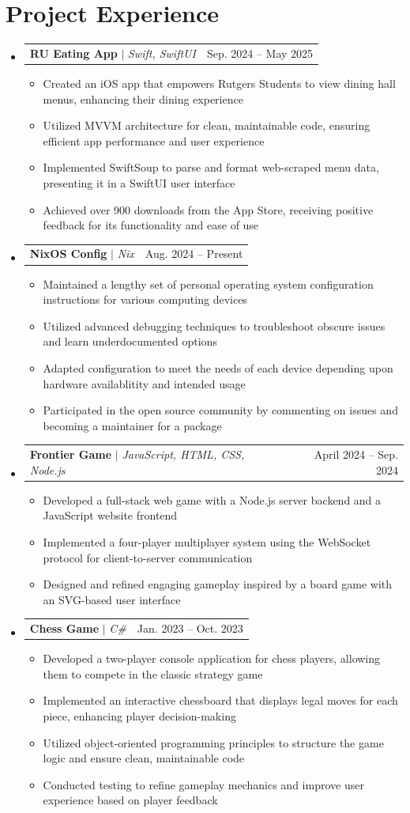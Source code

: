 \documentclass[letterpaper,11pt]{article}
\makeatletter
\newcommand{\resumeItem}[1]{
  \item\small{
    {#1 \vspace{-2pt}}
  }
}
\newcommand{\resumeProjectHeading}[2]{
    \item
    \begin{tabular*}{0.97\textwidth}{l@{\extracolsep{\fill}}r}
      \small#1 & #2 \\
    \end{tabular*}\vspace{-7pt}
}
\newcommand{\resumeSubHeadingListStart}{\begin{itemize}[leftmargin=0.15in, label={}]}
\newcommand{\resumeSubHeadingListEnd}{\end{itemize}}
\newcommand{\resumeItemListStart}{\begin{itemize}}
\newcommand{\resumeItemListEnd}{\end{itemize}\vspace{-5pt}}
\makeatother
\begin{document}
\section{Project Experience}
    \resumeSubHeadingListStart
      \resumeProjectHeading
          {\textbf{RU Eating App} $|$ \emph{Swift, SwiftUI}}{Sep. 2024 -- May 2025}
          \resumeItemListStart
            \resumeItem{Created an iOS app that empowers Rutgers Students to view dining hall menus, enhancing their dining experience}
            \resumeItem{Utilized MVVM architecture for clean, maintainable code, ensuring efficient app performance and user experience}
            \resumeItem{Implemented SwiftSoup to parse and format web-scraped menu data, presenting it in a SwiftUI user interface}
            \resumeItem{Achieved over 900 downloads from the App Store, receiving positive feedback for its functionality and ease of use}
          \resumeItemListEnd
      \resumeProjectHeading
          {\textbf{NixOS Config} $|$ \emph{Nix}}{Aug. 2024 -- Present}
          \resumeItemListStart
            \resumeItem{Maintained a lengthy set of personal operating system configuration instructions for various computing devices}
            \resumeItem{Utilized advanced debugging techniques to troubleshoot obscure issues and learn underdocumented options}
            \resumeItem{Adapted configuration to meet the needs of each device depending upon hardware availablitity and intended usage}
            \resumeItem{Participated in the open source community by commenting on issues and becoming a maintainer for a package}
          \resumeItemListEnd
      \resumeProjectHeading
          {\textbf{Frontier Game} $|$ \emph{JavaScript, HTML, CSS, Node.js}}{April 2024 -- Sep. 2024}
          \resumeItemListStart
            \resumeItem{Developed a full-stack web game with a Node.js server backend and a JavaScript website frontend}
            \resumeItem{Implemented a four-player multiplayer system using the WebSocket protocol for client-to-server communication}
            \resumeItem{Designed and refined engaging gameplay inspired by a board game with an SVG-based user interface}
          \resumeItemListEnd
      \resumeProjectHeading
          {\textbf{Chess Game} $|$ \emph{C\#}}{Jan. 2023 -- Oct. 2023}
          \resumeItemListStart
            \resumeItem{Developed a two-player console application for chess players, allowing them to compete in the classic strategy game}
            \resumeItem{Implemented an interactive chessboard that displays legal moves for each piece, enhancing player decision-making}
            \resumeItem{Utilized object-oriented programming principles to structure the game logic and ensure clean, maintainable code}
            \resumeItem{Conducted testing to refine gameplay mechanics and improve user experience based on player feedback}
          \resumeItemListEnd
    \resumeSubHeadingListEnd
\end{document}
